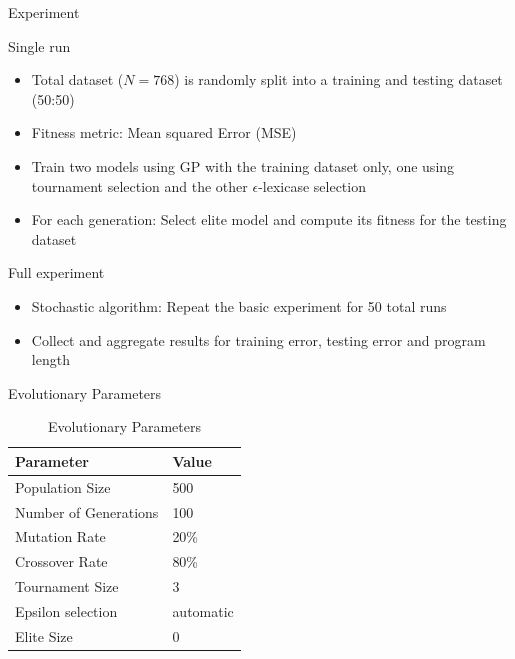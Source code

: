 \documentclass[
  ignorenonframetext,
]{beamer}
\providecommand{\tightlist}{%
  \setlength{\itemsep}{0pt}\setlength{\parskip}{0pt}}
\begin{document}
\begin{frame}{Experiment}
\protect\hypertarget{experiment}{}
\begin{block}{Single run}
\protect\hypertarget{single-run}{}
\begin{itemize}
\tightlist
\item
  Total dataset (\(N=768\)) is randomly split into a training and
  testing dataset (50:50)
\item
  Fitness metric: Mean squared Error (MSE)
\item
  Train two models using GP with the training dataset only, one using
  tournament selection and the other \(\epsilon\)-lexicase selection
\item
  For each generation: Select elite model and compute its fitness for
  the testing dataset
\end{itemize}
\end{block}

\begin{block}{Full experiment}
\protect\hypertarget{full-experiment}{}
\begin{itemize}
\tightlist
\item
  Stochastic algorithm: Repeat the basic experiment for 50 total runs
\item
  Collect and aggregate results for training error, testing error and
  program length
\end{itemize}
\end{block}
\end{frame}

\begin{frame}{Evolutionary Parameters}
\protect\hypertarget{evolutionary-parameters}{}
\begin{table}

\caption{\label{tab:unnamed-chunk-2}Evolutionary Parameters}
\centering
\begin{tabular}[t]{l|l}
\hline
Parameter & Value\\
\hline
Population Size & 500\\
\hline
Number of Generations & 100\\
\hline
Mutation Rate & 20\%\\
\hline
Crossover Rate & 80\%\\
\hline
Tournament Size & 3\\
\hline
Epsilon selection & automatic\\
\hline
Elite Size & 0\\
\hline
\end{tabular}
\end{table}
\end{frame}
\end{document}
